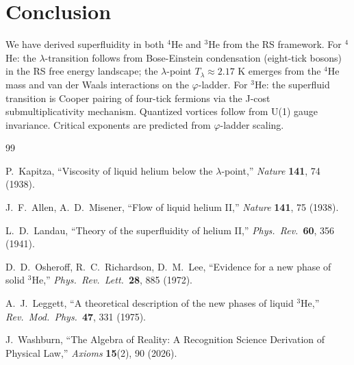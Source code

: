 \documentclass[12pt,a4paper]{article}
\theoremstyle{definition}
\theoremstyle{remark}
\begin{document}
\section{Conclusion}
\label{sec:conclusion}

We have derived superfluidity in both $^4$He and $^3$He from the RS
framework.  For $^4$He: the $\lambda$-transition follows from
Bose-Einstein condensation (eight-tick bosons) in the RS free energy
landscape; the $\lambda$-point $T_\lambda \approx 2.17$ K emerges from
the $^4$He mass and van der Waals interactions on the $\varphi$-ladder.
For $^3$He: the superfluid transition is Cooper pairing of four-tick
fermions via the J-cost submultiplicativity mechanism.  Quantized
vortices follow from U(1) gauge invariance.  Critical exponents are
predicted from $\varphi$-ladder scaling.

\begin{thebibliography}{99}

P.~Kapitza, ``Viscosity of liquid helium below the $\lambda$-point,''
\textit{Nature} \textbf{141}, 74 (1938).

J.~F.~Allen, A.~D.~Misener, ``Flow of liquid helium II,''
\textit{Nature} \textbf{141}, 75 (1938).

L.~D.~Landau, ``Theory of the superfluidity of helium II,''
\textit{Phys.\ Rev.}\ \textbf{60}, 356 (1941).

D.~D.~Osheroff, R.~C.~Richardson, D.~M.~Lee, ``Evidence for a new
phase of solid $^3$He,'' \textit{Phys.\ Rev.\ Lett.}\ \textbf{28},
885 (1972).

A.~J.~Leggett, ``A theoretical description of the new phases of liquid
$^3$He,'' \textit{Rev.\ Mod.\ Phys.}\ \textbf{47}, 331 (1975).

J.~Washburn, ``The Algebra of Reality: A Recognition Science Derivation
of Physical Law,'' \textit{Axioms} \textbf{15}(2), 90 (2026).

\end{thebibliography}
\end{document}
